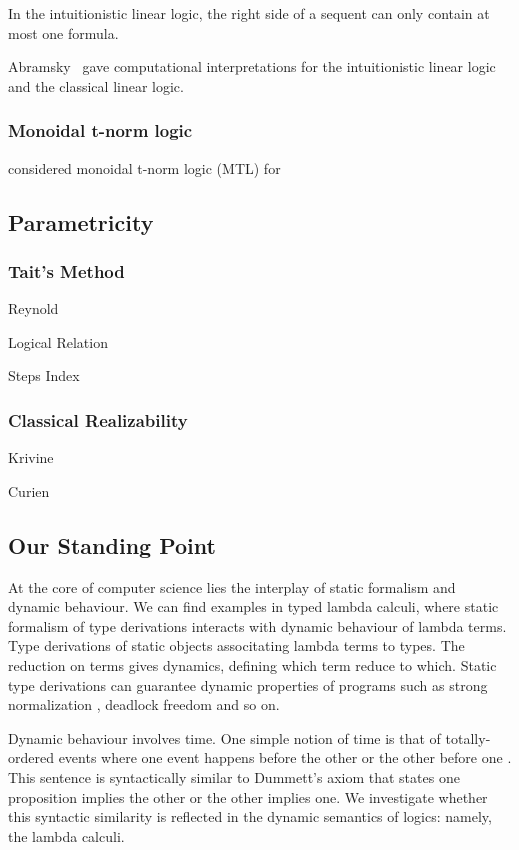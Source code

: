 In the intuitionistic linear logic, the right side of a sequent can only
contain at most one formula.

Abramsky~\citep{abramsky1993computational} gave computational
interpretations for the intuitionistic linear logic and the classical linear logic.


\subsubsection{Monoidal t-norm logic}

\citet{Esteva2001271} considered monoidal t-norm logic (MTL) for


\subsection{Parametricity}

\subsubsection{Tait's Method}

Reynold

Logical Relation

Steps Index

\subsubsection{Classical Realizability}

Krivine

Curien

\subsection{Our Standing Point}

At the core of computer science lies the interplay of static formalism
and dynamic behaviour.  We can find examples in typed lambda calculi,
where static formalism of type derivations interacts with dynamic
behaviour of lambda terms.
Type derivations of static objects associtating lambda terms to types.
The reduction on terms gives dynamics, defining which term reduce
to which.  Static type derivations can guarantee dynamic properties of
programs such as strong normalization ,
deadlock freedom 
and so on.

Dynamic behaviour involves time.
One simple notion of time is that of totally-ordered events where
one event happens before the other or the other before one .
This sentence is syntactically similar to Dummett's axiom that states
one proposition implies the other or the other implies one.
We investigate whether this syntactic similarity is reflected
in the dynamic semantics of logics: namely, the lambda calculi.


